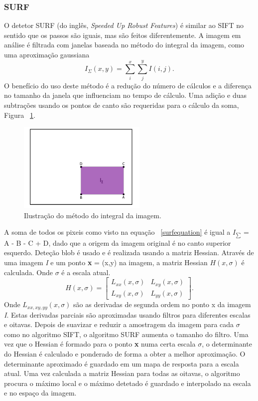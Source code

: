 \subsubsection{SURF}

O detetor SURF (do inglês, \textit{Speeded Up Robust Features}) é similar ao SIFT no sentido que os passos são iguais, mas são feitos diferentemente. A imagem em análise é filtrada com janelas baseada no método do integral da imagem, como uma aproximação gaussiana \begin{equation}\label{surfequation}
I_{\Sigma}(x,y) = \sum_{i}^{x}\sum_{j}^{y}{I(i,j)}. \end{equation}
O benefício do uso deste método é a redução do número de cálculos e a diferença no tamanho da janela que influenciam no tempo de cálculo. Uma adição e duas subtrações usando os pontos de canto são requeridas para o cálculo da soma, Figura ~\ref{fig:surfsqware}.

\begin{figure}[h!]
	\centering
	\includegraphics[width=0.4\linewidth]{figures/surfsqware}
	\caption{Ilustração do método do integral da imagem. \cite{VisualOdometryRodasVehicles}}
	\label{fig:surfsqware}
\end{figure}

A soma de todos os pixeis como visto na equação ~\ref{surfequation} é igual a \textit{$I_{\sum}$} = A - B - C + D, dado que a origem da imagem original é no canto superior esquerdo. Deteção blob é usado e é realizada usando a matriz Hessian. Através de uma imagem \textit{I} e um ponto \textbf{x} = (x,y) na imagem, a matriz Hessian $\textit{H}(x,\sigma)$ é calculada. Onde $\sigma$ é a escala atual. \[  \textit{H}(x,\sigma) = \left[ \begin{array}{cc}
L_{xx}(x,\sigma) & L_{xy}(x,\sigma) \\ 
L_{xy}(x,\sigma) & L_{yy}(x,\sigma)
\end{array} \right]. \] 
Onde $\textit{L}_{xx,xy,yy}(x,\sigma)$  são as derivadas de segunda ordem no ponto x da imagem \textit{I}. Estas derivadas parciais são aproximadas usando filtros para diferentes escalas e oitavas. Depois de suavizar e reduzir a amostragem da imagem para cada $\sigma$ como no algoritmo SIFT, o algoritmo SURF aumenta o tamanho do filtro. Uma vez que o Hessian é formado para o ponto \textbf{x} numa certa escala $\sigma$, o determinante do Hessian é calculado e ponderado de forma a obter a melhor aproximação.  O determinante aproximado é guardado em um mapa de resposta para a escala atual.
Uma vez calculada a matriz Hessian para todas as oitavas, o algoritmo procura o máximo local e o máximo detetado é guardado e interpolado na escala e no espaço da imagem. 

